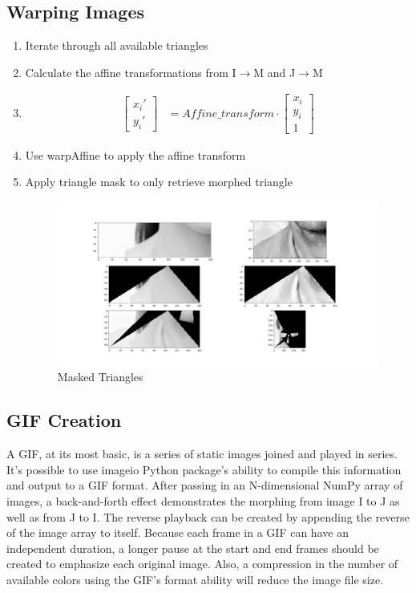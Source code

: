 \documentclass[journal]{IEEEtran}
\begin{document}
\subsection{Warping Images}
\begin{enumerate}[label=\alph*)]
\item Iterate through all available triangles
\item Calculate the affine transformations from I$\rightarrow$M and J$\rightarrow$M
\item
	\begin{align}
		\begin{bmatrix}
			x_i' \\ y_i'
		\end{bmatrix}
		&= Affine\_transform \cdot
		\begin{bmatrix}
			x_i \\ y_i \\ 1
		\end{bmatrix}
	\end{align}
\item Use warpAffine to apply the affine transform
\item Apply triangle mask to only retrieve morphed triangle
\begin{figure}[H]
	\includegraphics[width = \linewidth]{triangles}
	\caption{Masked Triangles}
\end{figure}
\end{enumerate}

\subsection{GIF Creation}
A GIF, at its most basic, is a series of static images joined and played in series.  It’s possible to use imageio Python package’s ability to compile this information and output to a GIF format. After passing in an N-dimensional NumPy array of images, a back-and-forth effect demonstrates the morphing from image I to J as well as from J to I. The reverse playback can be created by appending the reverse of the image array to itself. Because each frame in a GIF can have an independent duration, a longer pause at the start and end frames should be created to emphasize each original image. Also, a compression in the number of available colors using the GIF’s format ability will reduce the image file size.
\end{document}
